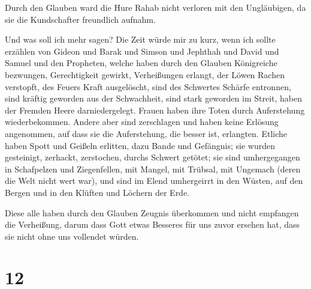  Durch den Glauben ward die Hure Rahab nicht verloren mit
den Ungläubigen, da sie die Kundschafter freundlich aufnahm.

 Und was soll ich mehr sagen? Die Zeit würde mir zu kurz,
wenn ich sollte erzählen von Gideon und Barak und Simson und Jephthah
und David und Samuel und den Propheten,  welche haben
durch den Glauben Königreiche bezwungen, Gerechtigkeit gewirkt,
Verheißungen erlangt, der Löwen Rachen verstopft,  des
Feuers Kraft ausgelöscht, sind des Schwertes Schärfe entronnen, sind
kräftig geworden aus der Schwachheit, sind stark geworden im Streit,
haben der Fremden Heere darniedergelegt.  Frauen haben
ihre Toten durch Auferstehung wiederbekommen. Andere aber sind
zerschlagen und haben keine Erlösung angenommen, auf dass sie die
Auferstehung, die besser ist, erlangten.  Etliche haben
Spott und Geißeln erlitten, dazu Bande und Gefängnis; 
sie wurden gesteinigt, zerhackt, zerstochen, durchs Schwert getötet; sie
sind umhergegangen in Schafpelzen und Ziegenfellen, mit Mangel, mit
Trübsal, mit Ungemach  (deren die Welt nicht wert war),
und sind im Elend umhergeirrt in den Wüsten, auf den Bergen und in den
Klüften und Löchern der Erde.

 Diese alle haben durch den Glauben Zeugnis überkommen
und nicht empfangen die Verheißung,  darum dass Gott
etwas Besseres für uns zuvor ersehen hat, dass sie nicht ohne uns
vollendet würden.

\hypertarget{section-11}{%
\section{12}\label{section-11}}


